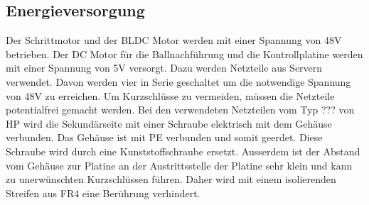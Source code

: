 \subsection{Energieversorgung}
Der Schrittmotor und der BLDC Motor werden mit einer Spannung von 48\si{\volt} 
betrieben. Der DC Motor für die Ballnachführung und die Kontrollplatine werden 
mit einer Spannung von 5\si{\volt} versorgt. Dazu werden Netzteile aus Servern 
verwendet. Davon werden vier in Serie geschaltet um die notwendige Spannung 
von 48\si{\volt} zu erreichen. Um Kurzschlüsse zu vermeiden, müssen die 
Netzteile potentialfrei gemacht werden. Bei den verwendeten Netzteilen vom Typ 
??? von HP wird die Sekundärseite mit einer Schraube elektrisch mit dem 
Gehäuse verbunden. Das Gehäuse ist mit PE verbunden und somit geerdet. Diese 
Schraube wird durch eine Kunststoffschraube ersetzt. Ausserdem ist der Abstand 
vom Gehäuse zur Platine an der Austrittsstelle der Platine sehr klein und kann 
zu unerwünschten Kurzschlüssen führen. Daher wird mit einem isolierenden 
Streifen aus FR4 eine Berührung verhindert. 
